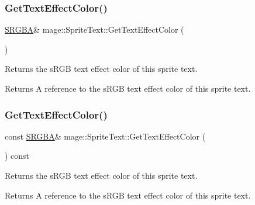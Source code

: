 \subsubsection{\texorpdfstring{Get\+Text\+Effect\+Color()}{GetTextEffectColor()}\hspace{0.1cm}{\footnotesize\ttfamily [1/2]}}
{\footnotesize\ttfamily \hyperlink{structmage_1_1_s_r_g_b_a}{S\+R\+G\+BA}\& mage\+::\+Sprite\+Text\+::\+Get\+Text\+Effect\+Color (\begin{DoxyParamCaption}{ }\end{DoxyParamCaption})\hspace{0.3cm}{\ttfamily [noexcept]}}

Returns the s\+R\+GB text effect color of this sprite text.

\begin{DoxyReturn}{Returns}
A reference to the s\+R\+GB text effect color of this sprite text. 
\end{DoxyReturn}
\hypertarget{classmage_1_1_sprite_text_af9f15b5b215e1433cee2152a5ce5e299}{}\label{classmage_1_1_sprite_text_af9f15b5b215e1433cee2152a5ce5e299} 
\subsubsection{\texorpdfstring{Get\+Text\+Effect\+Color()}{GetTextEffectColor()}\hspace{0.1cm}{\footnotesize\ttfamily [2/2]}}
{\footnotesize\ttfamily const \hyperlink{structmage_1_1_s_r_g_b_a}{S\+R\+G\+BA}\& mage\+::\+Sprite\+Text\+::\+Get\+Text\+Effect\+Color (\begin{DoxyParamCaption}{ }\end{DoxyParamCaption}) const\hspace{0.3cm}{\ttfamily [noexcept]}}

Returns the s\+R\+GB text effect color of this sprite text.

\begin{DoxyReturn}{Returns}
A reference to the s\+R\+GB text effect color of this sprite text. 
\end{DoxyReturn}
\hypertarget{classmage_1_1_sprite_text_a727e8c9e79fb0caab58c9121e798467b}{}\label{classmage_1_1_sprite_text_a727e8c9e79fb0caab58c9121e798467b} 
